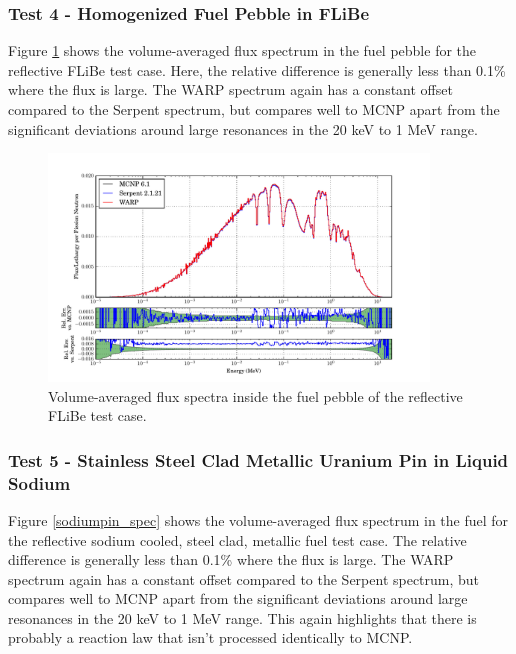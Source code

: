 \documentclass[preprint,12pt]{elsarticle}
\begin{document}
\newpage
\subsubsection{Test 4 - Homogenized Fuel Pebble in FLiBe}

Figure \ref{flibe_spec} shows the volume-averaged flux spectrum in the fuel pebble for the reflective FLiBe test case.  Here, the relative difference is generally less than 0.1\% where the flux is large.  The WARP spectrum again has a constant offset compared to the Serpent spectrum, but compares well to MCNP apart from the significant deviations around large resonances in the 20 keV to 1 MeV range.  

\begin{figure}[h!]
\centering
\includegraphics[width=0.9\textwidth,trim= 1cm 0cm 1cm 0cm]{graphics/flibe_spec.pdf}
\caption{Volume-averaged flux spectra inside the fuel pebble of the reflective FLiBe test case. \label{flibe_spec} }
\end{figure}

\newpage
\subsubsection{Test 5 - Stainless Steel Clad Metallic Uranium Pin in Liquid Sodium}

Figure \ref{sodiumpin_spec} shows the volume-averaged flux spectrum in the fuel for the reflective sodium cooled, steel clad, metallic fuel test case.  The relative difference is generally less than 0.1\% where the flux is large.  The WARP spectrum again has a constant offset compared to the Serpent spectrum, but compares well to MCNP apart from the significant deviations around large resonances in the 20 keV to 1 MeV range.  This again highlights that there is probably a reaction law that isn't processed identically to MCNP.
\end{document}
